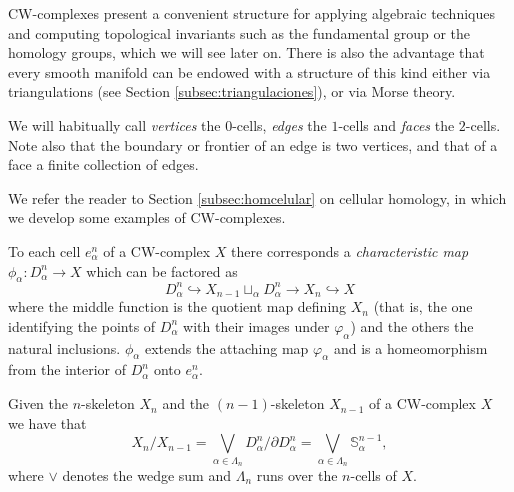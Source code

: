 CW-complexes present a convenient structure for applying algebraic techniques and computing topological invariants such as the fundamental group or the homology groups, which we will see later on. There is also the advantage that every smooth manifold can be endowed with a structure of this kind either via triangulations (see Section \ref{subsec:triangulaciones}), or via Morse theory.

\begin{nota}
    We will habitually call \textit{vertices} the $0$-cells, \textit{edges} the $1$-cells and \textit{faces} the $2$-cells. Note also that the boundary or frontier of an edge is two vertices, and that of a face a finite collection of edges.
\end{nota}

We refer the reader to Section \ref{subsec:homcelular} on cellular homology, in which we develop some examples of CW-complexes.

\medskip

\begin{definition}
    To each cell $e^n_{\alpha}$ of a CW-complex $X$ there corresponds a \textit{characteristic map} $\phi_{\alpha} : D^n_{\alpha}\to X$ which can be factored as
    \begin{equation*}
        D^n_{\alpha} \hookrightarrow X_{n-1} \sqcup_{\alpha} D^n_{\alpha} \to X_n \hookrightarrow X
    \end{equation*}
    where the middle function is the quotient map defining $X_n$ (that is, the one identifying the points of $D^n_{\alpha}$ with their images under $\varphi_{\alpha}$) and the others the natural inclusions. $\phi_{\alpha}$ extends the attaching map $\varphi_{\alpha}$ and is a homeomorphism from the interior of $D^n_{\alpha}$ onto $e^n_{\alpha}$.

\end{definition}
\bigskip

\begin{proposition}
    Given the $n$-skeleton $X_n$ and the $(n-1)$-skeleton $X_{n-1}$ of a CW-complex $X$ we have that
    \begin{equation*}
        X_n/X_{n-1} = \bigvee_{\alpha\in\Lambda_n} D^n_{\alpha}/\partial D^n_{\alpha} = \bigvee_{\alpha\in\Lambda_n} \mathbb{S}^{n-1}_{\alpha}, %
    \end{equation*}
    where $\vee$ denotes the wedge sum \cite[p.~10]{hatcher2002} and $\Lambda_n$ runs over the $n$-cells of $X$.
\end{proposition}

